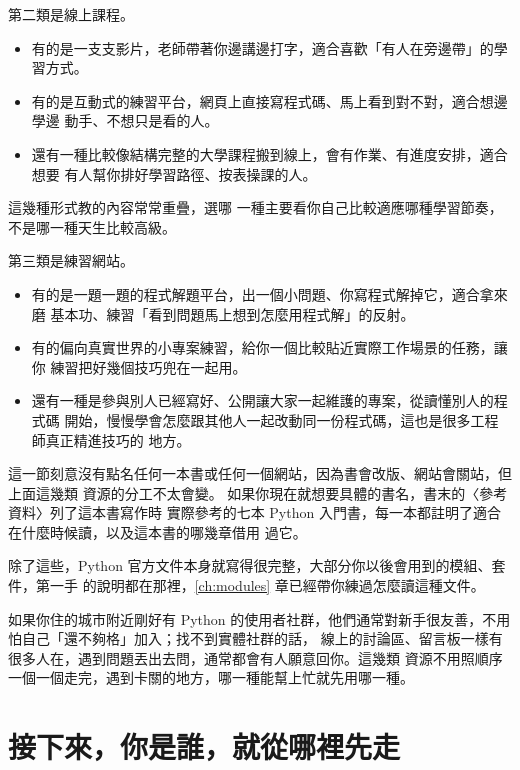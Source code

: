 第二類是線上課程。

\begin{itemize}
    \item 有的是一支支影片，老師帶著你邊講邊打字，適合喜歡「有人在旁邊帶」的學習方式。
    \item 有的是互動式的練習平台，網頁上直接寫程式碼、馬上看到對不對，適合想邊學邊
    動手、不想只是看的人。
    \item 還有一種比較像結構完整的大學課程搬到線上，會有作業、有進度安排，適合想要
    有人幫你排好學習路徑、按表操課的人。
\end{itemize}

這幾種形式教的內容常常重疊，選哪
一種主要看你自己比較適應哪種學習節奏，不是哪一種天生比較高級。

第三類是練習網站。

\begin{itemize}
    \item 有的是一題一題的程式解題平台，出一個小問題、你寫程式解掉它，適合拿來磨
    基本功、練習「看到問題馬上想到怎麼用程式解」的反射。
    \item 有的偏向真實世界的小專案練習，給你一個比較貼近實際工作場景的任務，讓你
    練習把好幾個技巧兜在一起用。
    \item 還有一種是參與別人已經寫好、公開讓大家一起維護的專案，從讀懂別人的程式碼
    開始，慢慢學會怎麼跟其他人一起改動同一份程式碼，這也是很多工程師真正精進技巧的
    地方。
\end{itemize}

這一節刻意沒有點名任何一本書或任何一個網站，因為書會改版、網站會關站，但上面這幾類
資源的分工不太會變。 如果你現在就想要具體的書名，書末的〈參考資料〉列了這本書寫作時
實際參考的七本 Python 入門書，每一本都註明了適合在什麼時候讀，以及這本書的哪幾章借用
過它。

除了這些，Python 官方文件本身就寫得很完整，大部分你以後會用到的模組、套件，第一手
的說明都在那裡，\ref{ch:modules} 章已經帶你練過怎麼讀這種文件。

如果你住的城市附近剛好有 Python
的使用者社群，他們通常對新手很友善，不用怕自己「還不夠格」加入；找不到實體社群的話，
線上的討論區、留言板一樣有很多人在，遇到問題丟出去問，通常都會有人願意回你。這幾類
資源不用照順序一個一個走完，遇到卡關的地方，哪一種能幫上忙就先用哪一種。

\section{接下來，你是誰，就從哪裡先走}
\label{sec:next-steps-by-reader}

